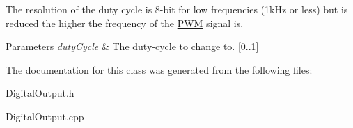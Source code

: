 The resolution of the duty cycle is 8-\/bit for low frequencies (1kHz or less) but is reduced the higher the frequency of the \hyperlink{classPWM}{PWM} signal is.


\begin{DoxyParams}{Parameters}
{\em dutyCycle} & The duty-\/cycle to change to. \mbox{[}0..1\mbox{]} \\
\hline
\end{DoxyParams}


The documentation for this class was generated from the following files:\begin{DoxyCompactItemize}
\item 
DigitalOutput.h\item 
DigitalOutput.cpp\end{DoxyCompactItemize}
